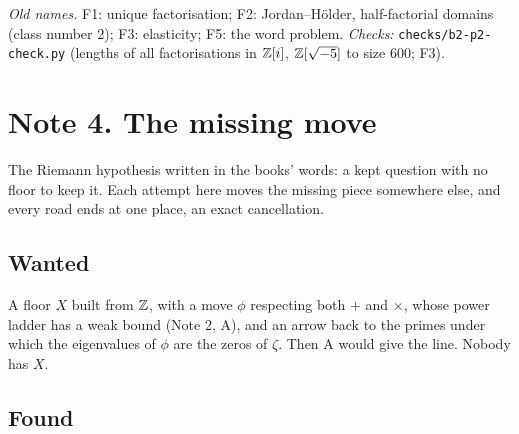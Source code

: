 \noindent\emph{Old names.} F1: unique factorisation; F2: Jordan--H\"older, half-factorial domains (class number $2$); F3: elasticity; F5: the word problem. \emph{Checks:} \texttt{checks/b2-p2-check.py} (lengths of all factorisations in $\mathbb{Z}[i]$, $\mathbb{Z}[\sqrt{-5}]$ to size $600$; F3).

\newpage
\section*{Note 4. The missing move}
\begin{center}
{\small The Riemann hypothesis written in the books' words: a kept question with no floor to keep it. Each attempt here moves the missing piece somewhere else, and every road ends at one place, an exact cancellation.}
\end{center}

\subsection*{Wanted}

\begin{lines}
\item[\lab{W}] A floor $X$ built from $\mathbb{Z}$, with a move $\phi$ respecting both $+$ and $\times$, whose power ladder has a weak bound (Note 2, A), and an arrow back to the primes under which the eigenvalues of $\phi$ are the zeros of $\zeta$. Then A would give the line. Nobody has $X$.
\end{lines}

\subsection*{Found}

